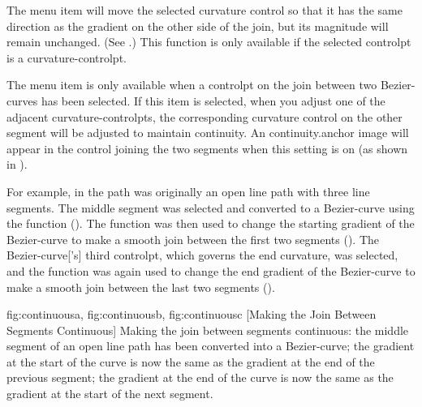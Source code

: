 
The  menu item will move the
selected curvature control so that it has the same direction as the
gradient on the other side of the join, but its magnitude will
remain unchanged. (See .)
This function is only available if the selected \gls{controlpt} is
a \gls{curvature-controlpt}.


The  menu item is only available
when a \gls*{controlpt} on the join between two \glspl{Bezier-curve}
has been selected. If this item is selected, when you adjust one of
the adjacent \glspl{curvature-controlpt}, the corresponding curvature
control on the other segment will be adjusted to maintain
\gls{continuity}. An \gls{continuity.anchor} image will appear in the control joining the
two segments when this setting is on (as shown in
).

For example, in  the path was originally
an open line \gls{path} with three line segments.  The middle segment was
selected and converted to a \gls{Bezier-curve} using the
 function
(). The
 function was then
used to change the starting \gls{gradient} of the \gls{Bezier-curve} to make
a smooth join between the first two segments
().  The \gls{Bezier-curve}['s] third
\gls*{controlpt}, which governs the end curvature, was selected, and
the  function was
again used to change the end \gls{gradient} of the \gls{Bezier-curve} to
make a smooth join between the last two segments
().

{
 {fig:continuousa}{}{},
 {fig:continuousb}{}{},
 {fig:continuousc}{}{}
}
[Making the Join Between Segments Continuous]
{Making the join between segments continuous: 
 the middle segment of
an open line path has been converted into a \gls{Bezier-curve};
 the gradient at the start of the curve is now the same as
the gradient at the end of the previous segment; 
 the
gradient at the end of the curve is now the same as the gradient at
the start of the next segment.}

